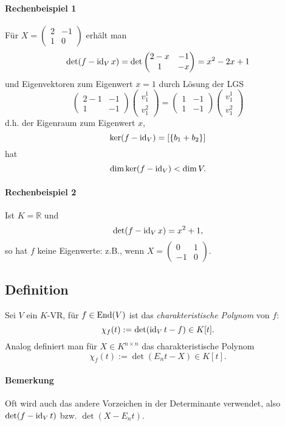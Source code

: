 \paragraph{Rechenbeispiel 1}
	Für $ X = \begin{pmatrix}2&-1\\1&0\end{pmatrix} $ erhält man
		\[ \det(f-\operatorname{id}_Vx) = \det\begin{pmatrix}2-x&-1\\1&-x	\end{pmatrix} =x^2-2x+1 \]
	und Eigenvektoren zum Eigenwert $ x = 1 $ durch Lösung der LGS
		\[ \begin{pmatrix}
		2-1&-1\\1&-1
		\end{pmatrix}\begin{pmatrix}
		v_1^1\\v_1^2
		\end{pmatrix} =  \begin{pmatrix}
		1&-1\\1&-1
		\end{pmatrix}\begin{pmatrix}
		v_1^1\\v_1^2
		\end{pmatrix} \]
	d.h. der Eigenraum zum Eigenwert $ x $,
		\[ \ker(f-\operatorname{id}_V) = [\{b_1+b_2\}] \]
	hat
		\[ \dim \ker(f-\operatorname{id}_V)<\dim V. \]
\paragraph{Rechenbeispiel 2}
	Ist $ K=\mathbb{R} $ und
		\[ \det(f-\operatorname{id}_Vx)=x^2+1, \]
	so hat $ f $ keine Eigenwerte: z.B., wenn
		$ X=\begin{pmatrix} 0&1\\-1&0 \end{pmatrix} $.
		
\subsection{Definition} 
\begin{Definition}
	Sei $ V $ ein $ K $-VR, für $ f\in\operatorname{End}(V) $ ist das \emph{charakteristische Polynom} von $ f $:
		\[ \chi_f(t) := \det (\operatorname{id}_Vt-f)\in K[t]. \]
	Analog definiert man für $ X\in K^{n\times n} $ das charakteristische Polynom
		\[ \chi_f(t) := \det (E_nt-X)\in K[t]. \]
\end{Definition}
\paragraph{Bemerkung}
	Oft wird auch das andere Vorzeichen in der Determinante verwendet, also $ \det(f-\operatorname{id}_Vt) $ bzw. $ \det(X-E_nt) $.

